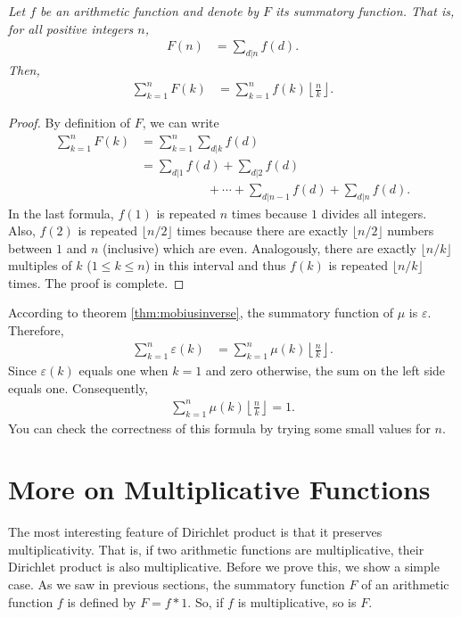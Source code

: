 \documentclass[12pt]{subfile}
\begin{document}
		\begin{theorem}\slshape\label{thm:sum-of-sum-function}
			Let $f$ be an arithmetic function and denote by $F$ its summatory function. That is, for all positive integers $n$,
				\begin{align*}
					F(n) &= \sum_{d|n} f(d).
				\end{align*}
			Then,
				\begin{align*}
					\sum_{k=1}^{n} F(k) &= \sum_{k=1}^{n} f(k) \left\lfloor \frac{n}{k}\right\rfloor.
				\end{align*}
		\end{theorem}

		\begin{proof}
			By definition of $F$, we can write
				\begin{align*}
					\sum_{k=1}^{n} F(k) &= \sum_{k=1}^{n} \sum_{d|k} f(d)\\
										&= \sum_{d|1} f(d) + \sum_{d|2} f(d)\\ &\phantom{=} \qquad \qquad +\cdots + \sum_{d|n-1} f(d)+\sum_{d|n} f(d).
				\end{align*}
			In the last formula, $f(1)$ is repeated $n$ times because $1$ divides all integers. Also, $f(2)$ is repeated $\lfloor n/2 \rfloor$ times because there are exactly $\lfloor n/2 \rfloor$ numbers between $1$ and $n$ (inclusive) which are even. Analogously, there are exactly $\lfloor n/k \rfloor$ multiples of $k$ ($1 \leq k \leq n$) in this interval and thus $f(k)$ is repeated $\lfloor n/k \rfloor$ times. The proof is complete.
		\end{proof}

		\begin{example}
			According to theorem \ref{thm:mobiusinverse}, the summatory function of $\mu$ is $\varepsilon$. Therefore,
				\begin{align*}
					\sum_{k=1}^{n} \varepsilon(k) &= \sum_{k=1}^{n} \mu(k) \left\lfloor \frac{n}{k}\right\rfloor.
				\end{align*}
			Since $\varepsilon(k)$ equals one when $k=1$ and zero otherwise, the sum on the left side equals one. Consequently,
				\begin{align*}
					\sum_{k=1}^{n} \mu(k) \left\lfloor \frac{n}{k}\right\rfloor = 1.
				\end{align*}
			You can check the correctness of this formula by trying some small values for $n$.
		\end{example}


\section{More on Multiplicative Functions}
The most interesting feature of Dirichlet product is that it preserves multiplicativity. That is, if two arithmetic functions are multiplicative, their Dirichlet product is also multiplicative. Before we prove this, we show a simple case. As we saw in previous sections, the summatory function $F$ of an arithmetic function $f$ is defined by $F=f\ast 1$. So, if $f$ is multiplicative, so is $F$.
\end{document}
